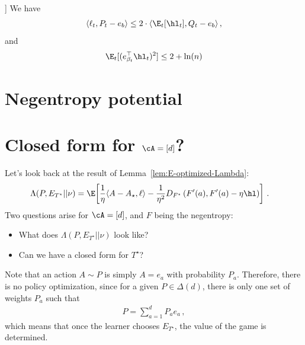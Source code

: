 \begin{lemma}[\cite{lattimore2024bandit}[Lemma 8.3]]
    We have
    \begin{align*}
        \langle \ell_t, P_t - e_{b} \rangle
        \leq 2 \cdot \langle \E_t[\hl_t], Q_t - e_{b} \rangle\,,
    \end{align*}
    and
    \begin{align*}
        \E_t[(e_{\beta_t}^\top \hl_t)^2]
        \leq 2 + \ln(n)
    \end{align*}
\end{lemma}

\hrulefill
\section{Negentropy potential}

\section{Closed form for \texorpdfstring{$\cA = [d]$}{A = [d]}?}
Let's look back at the result of Lemma~\ref{lem:E-optimized-Lambda}:
\begin{align*}
    \Lambda(P, E_{T^\star} || \nu)
     & =
    \E\!\left[
        \frac{1}{\eta}
        \langle A - A_\star, \ell\rangle
        -
        \frac{1}{\eta^2}
        D_{F^\star}\left(F'(a), F'(a) - \eta \hl\right)
        \right]\,.
\end{align*}
Two questions arise for $\cA = [d]$, and $F$ being the negentropy:
\begin{itemize}
    \item What does $\Lambda(P, E_{T^\star} || \nu)$ look like?
    \item Can we have a closed form for $T^\star$?
\end{itemize}
Note that an action $A \sim P$ is simply $A = e_a$ with probability $P_a$.
Therefore, there is no policy optimization, since for a given $P \in \Delta(d)$,
there is only one set of weights $P_a$ such that
\begin{align*}
    P = \sum_{a=1}^d P_a e_a\,,
\end{align*}
which means that once the learner chooses $E_{T^\star}$, the value of the game is determined.


